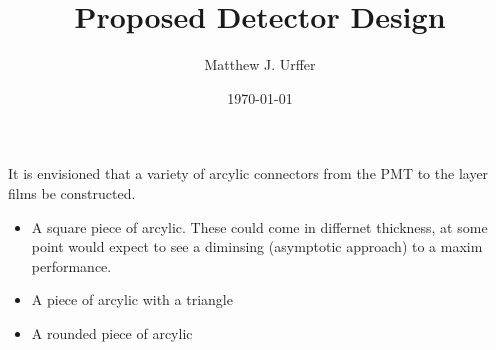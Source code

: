 \documentclass[]{report}
\title{Proposed Detector Design}
\author{Matthew J. Urffer}
\date{\today}
\begin{document}
\maketitle

\listoftodos





\item It is envisioned that a variety of arcylic connectors from the PMT to the layer films be constructed.
\begin{itemize}
    \item A square piece of arcylic. These could come in differnet thickness, at some point would expect to see a diminsing (asymptotic approach) to a maxim performance.
    \item A piece of arcylic with a triangle
    \item A rounded piece of arcylic
\end{itemize}

\end{document}
